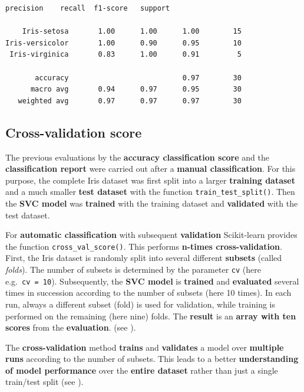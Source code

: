 \documentclass [oneside,10pt,a4paper,ngerman,BCOR10mm,headsepline,parindent,final]{scrartcl}
\begin{document}
    \begin{Verbatim}[commandchars=\\\{\}]
                 precision    recall  f1-score   support

    Iris-setosa       1.00      1.00      1.00        15
Iris-versicolor       1.00      0.90      0.95        10
 Iris-virginica       0.83      1.00      0.91         5

       accuracy                           0.97        30
      macro avg       0.94      0.97      0.95        30
   weighted avg       0.97      0.97      0.97        30

    \end{Verbatim}

    \hypertarget{cross-validation-score}{%
\subsection{Cross-validation score}\label{cross-validation-score}}

The previous evaluations by the \textbf{accuracy classification score}
and the \textbf{classification report} were carried out after a
\textbf{manual classification}. For this purpose, the complete Iris
dataset was first split into a larger \textbf{training dataset} and a
much smaller \textbf{test dataset} with the function
\texttt{train\_test\_split()}. Then the \textbf{SVC model} was
\textbf{trained} with the training dataset and \textbf{validated} with
the test dataset.

For \textbf{automatic classification} with subsequent
\textbf{validation} Scikit-learn provides the function
\texttt{cross\_val\_score()}. This performs \textbf{n-times
cross-validation}. First, the Iris dataset is randomly split into
several different \textbf{subsets} (called \emph{folds}). The number of
subsets is determined by the parameter \texttt{cv} (here
e.g.~\texttt{cv\ =\ 10}). Subsequently, the \textbf{SVC model} is
\textbf{trained} and \textbf{evaluated} several times in succession
according to the number of subsets (here 10 times). In each run, always
a different subset (fold) is used for validation, while training is
performed on the remaining (here nine) folds. The \textbf{result} is an
\textbf{array with ten scores} from the \textbf{evaluation}. (see
\cite{Geron_2018}).

The \textbf{cross-validation} method \textbf{trains} and
\textbf{validates} a model over \textbf{multiple runs} according to the
number of subsets. This leads to a better \textbf{understanding of model
performance} over the \textbf{entire dataset} rather than just a single
train/test split (see \cite{cross_val_score_2022}).
\end{document}

